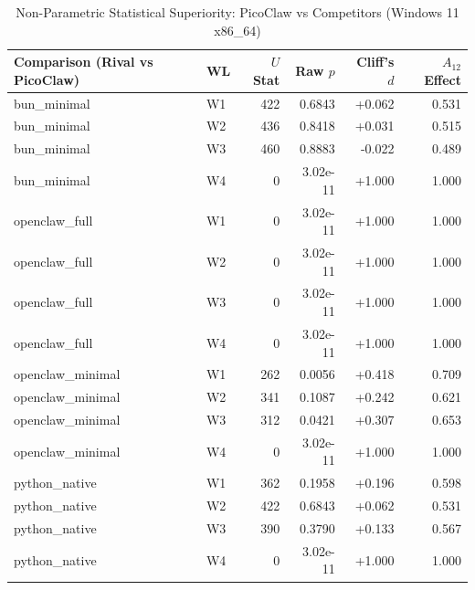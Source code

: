 \begin{table}[t]
\centering\small
\caption{Non-Parametric Statistical Superiority: PicoClaw vs Competitors (Windows 11 x86_64)}
\label{tab:Windows_stat_tests}
\begin{tabular}{llrrrr}
\toprule
Comparison (Rival vs PicoClaw) & WL & $U$ Stat & Raw $p$ & Cliff's $d$ & $A_{12}$ Effect \\
\midrule
bun\_minimal & W1 & 422 & 0.6843 & +0.062 & 0.531 \\
bun\_minimal & W2 & 436 & 0.8418 & +0.031 & 0.515 \\
bun\_minimal & W3 & 460 & 0.8883 & -0.022 & 0.489 \\
bun\_minimal & W4 & 0 & 3.02e-11 & +1.000 & 1.000 \\
openclaw\_full & W1 & 0 & 3.02e-11 & +1.000 & 1.000 \\
openclaw\_full & W2 & 0 & 3.02e-11 & +1.000 & 1.000 \\
openclaw\_full & W3 & 0 & 3.02e-11 & +1.000 & 1.000 \\
openclaw\_full & W4 & 0 & 3.02e-11 & +1.000 & 1.000 \\
openclaw\_minimal & W1 & 262 & 0.0056 & +0.418 & 0.709 \\
openclaw\_minimal & W2 & 341 & 0.1087 & +0.242 & 0.621 \\
openclaw\_minimal & W3 & 312 & 0.0421 & +0.307 & 0.653 \\
openclaw\_minimal & W4 & 0 & 3.02e-11 & +1.000 & 1.000 \\
python\_native & W1 & 362 & 0.1958 & +0.196 & 0.598 \\
python\_native & W2 & 422 & 0.6843 & +0.062 & 0.531 \\
python\_native & W3 & 390 & 0.3790 & +0.133 & 0.567 \\
python\_native & W4 & 0 & 3.02e-11 & +1.000 & 1.000 \\
\bottomrule
\end{tabular}
\end{table}
